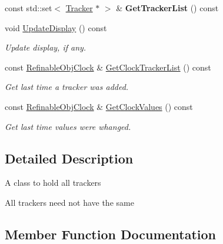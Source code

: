 \begin{DoxyCompactItemize}
const std\+::set$<$ \mbox{\hyperlink{class_obj_cryst_1_1_tracker}{Tracker}} $\ast$ $>$ \& {\bfseries Get\+Tracker\+List} () const
\item 
\mbox{\label{class_obj_cryst_1_1_main_tracker_ac2c20936fb61dccaf6853c188b49c965}} 
void \mbox{\hyperlink{class_obj_cryst_1_1_main_tracker_ac2c20936fb61dccaf6853c188b49c965}{Update\+Display}} () const
\begin{DoxyCompactList}\small\item\em Update display, if any. \end{DoxyCompactList}\item 
\mbox{\label{class_obj_cryst_1_1_main_tracker_afc13f9397829981e3c24977754531a2e}} 
const \mbox{\hyperlink{class_obj_cryst_1_1_refinable_obj_clock}{Refinable\+Obj\+Clock}} \& \mbox{\hyperlink{class_obj_cryst_1_1_main_tracker_afc13f9397829981e3c24977754531a2e}{Get\+Clock\+Tracker\+List}} () const
\begin{DoxyCompactList}\small\item\em Get last time a tracker was added. \end{DoxyCompactList}\item 
\mbox{\label{class_obj_cryst_1_1_main_tracker_adb16f9b392262c74f1855e78a9a731bd}} 
const \mbox{\hyperlink{class_obj_cryst_1_1_refinable_obj_clock}{Refinable\+Obj\+Clock}} \& \mbox{\hyperlink{class_obj_cryst_1_1_main_tracker_adb16f9b392262c74f1855e78a9a731bd}{Get\+Clock\+Values}} () const
\begin{DoxyCompactList}\small\item\em Get last time values were whanged. \end{DoxyCompactList}\end{DoxyCompactItemize}


\subsection{Detailed Description}
A class to hold all trackers

All trackers need not have the same 

\subsection{Member Function Documentation}
\mbox{\label{class_obj_cryst_1_1_main_tracker_a1bbb24cd3ff9eb57aca89f8b2c64b68b}} 
